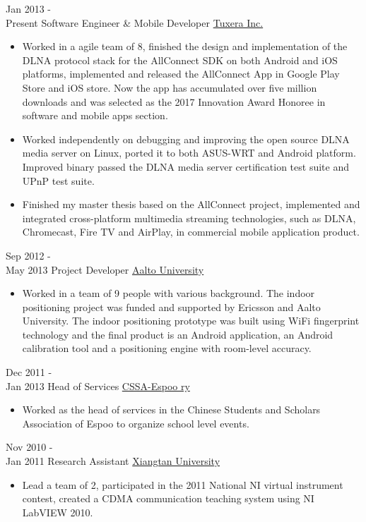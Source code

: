 \documentclass[letterpaper]{twentysecondcv} %
\begin{document}
\begin{twenty} %
	\twentyitem
    	{Jan 2013 - \\Present}
        {Software Engineer \& Mobile Developer}
        {\href{http://www.tuxera.com/}{Tuxera Inc.}}
        {}
        {
        {\begin{itemize}
        \item Worked in a agile team of 8, finished the design and implementation of the DLNA protocol stack for the AllConnect SDK on both Android and iOS platforms, implemented and released the AllConnect App in Google Play Store and iOS store. Now the app has accumulated over five million downloads and was selected as the 2017 Innovation Award Honoree in software and mobile apps section.
        \item Worked independently on debugging and improving the open source DLNA media server on Linux, ported it to both ASUS-WRT and Android platform. Improved binary passed the DLNA media server certification test suite and UPnP test suite.
        \item Finished my master thesis based on the AllConnect project, implemented and integrated cross-platform multimedia streaming technologies, such as DLNA, Chromecast, Fire TV and AirPlay, in commercial mobile application product.
    \end{itemize}}
        }
        
    \twentyitem
   		{Sep 2012 - \\ May 2013}
        {Project Developer}
        {\href{http://www.aalto.fi/en/}{Aalto University}}
        {}
        {
        {\begin{itemize}
        \item Worked in a team of 9 people with various background. The indoor positioning project was funded and supported by Ericsson and Aalto University. The indoor positioning prototype was built using WiFi fingerprint technology and the final product is an Android application, an Android calibration tool and a positioning engine with room-level accuracy.
    \end{itemize}}
        }
        
        \twentyitem
   		{Dec 2011 - \\ Jan 2013}
        {Head of Services}
        {\href{https://cssa.ayy.fi/}{CSSA-Espoo ry}}
        {}
        {
        \begin{itemize}
        \item Worked as the head of services in the Chinese Students and Scholars Association of Espoo to organize school level events.
    \end{itemize}
    	}
     \twentyitem
   		{Nov 2010 - \\ Jan 2011}
        {Research Assistant}
        {\href{http://www.xtu.edu.cn/english/}{Xiangtan University}}
        {}
        {
        \begin{itemize}
        \item Lead a team of 2, participated in the 2011 National NI virtual instrument contest, created a CDMA communication teaching system using NI LabVIEW 2010.
    \end{itemize}
    	}
        
\end{twenty}
\end{document}
